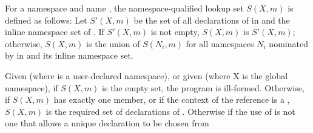 \pnum
For a namespace  and name , the namespace-qualified lookup set
$S(X, m)$ is defined as follows: Let $S'(X, m)$ be the set of all
declarations of  in  and the inline namespace set of
. If $S'(X, m)$ is not empty, $S(X, m)$
is $S'(X, m)$; otherwise, $S(X, m)$ is the union of $S(N_i, m)$ for
all namespaces $N_i$ nominated by  in
 and its inline namespace set.

\pnum
Given  (where  is a user-declared namespace), or
given  (where X is the global namespace), if
$S(X, m)$ is the empty set, the program is ill-formed. Otherwise, if
$S(X, m)$ has exactly one member, or if the context of the reference is
a , $S(X, m)$
is the
required set of declarations of . Otherwise if the use of
 is not one that allows a unique declaration to be chosen from

